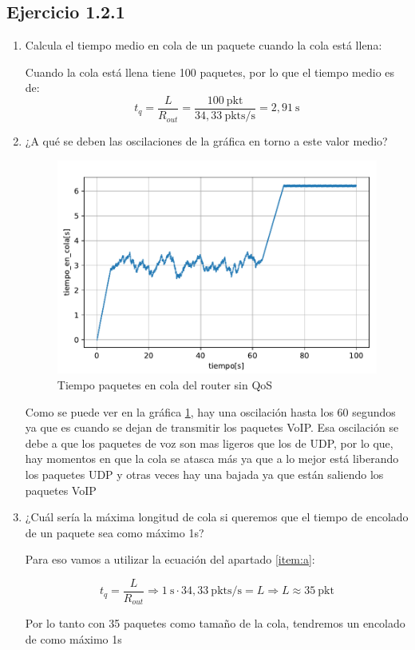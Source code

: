\subsection{Ejercicio 1.2.1}
\begin{enumerate}
    
    \item Calcula el tiempo medio en cola de un paquete cuando la cola está llena: \label{item:a}
    
    Cuando la cola está llena tiene 100 paquetes, por lo que el tiempo medio es de:
        \[
          t_{q} = \frac{L}{R_{out}} = \frac{100~\mathrm{pkt}}{34,33~\mathrm{pkts/s}} = 2,91~\mathrm{s}
        \]
    
    \item ¿A qué se deben las oscilaciones de la gráfica en torno a este valor medio? \label{item:b}
    
    \begin{figure}[!ht]
        \centering
        \includegraphics{graficas/sinQoS/tiempo_en_cola_sinQoS.pdf}
        \caption{Tiempo paquetes en cola del router sin QoS}
        \label{fig:sinqos_time}
    \end{figure}

    Como se puede ver en la gráfica \ref{fig:sinqos_time}, hay una oscilación hasta los 60 segundos ya que es cuando se dejan de transmitir los paquetes VoIP. Esa oscilación
    se debe a que los paquetes de voz son mas ligeros que los de UDP, por lo que, hay momentos en que la cola se atasca más ya que a lo
    mejor está liberando los paquetes UDP y otras veces hay una bajada ya que están saliendo los paquetes VoIP
    
    \item ¿Cuál sería la máxima longitud de cola si queremos que el tiempo de encolado de un paquete sea como máximo 1s? \label{item:c}
    
    Para eso vamos a utilizar la ecuación del apartado \ref{item:a}:

    \[
      t_{q} =  \frac{L}{R_{out}} \Rightarrow 1~\mathrm{s} \cdot 34,33~\mathrm{pkts/s} = L \Rightarrow L \approx 35~\mathrm{pkt}
    \]

    Por lo tanto con 35 paquetes como tamaño de la cola, tendremos un encolado de como máximo 1s


\end{enumerate}

